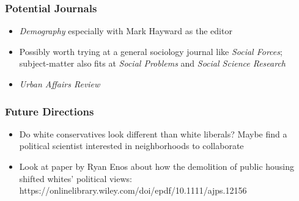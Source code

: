 \documentclass{baderart}
\providecommand{\tightlist}{%
  \setlength{\itemsep}{0pt}\setlength{\parskip}{0pt}}
\begin{document}
\subsubsection{Potential Journals}\label{potential-journals}

\begin{itemize} \tightlist \item   \emph{Demography} especially with Mark Hayward as the editor \item   Possibly worth trying at a general sociology journal like \emph{Social   Forces}; subject-matter also fits at \emph{Social Problems} and   \emph{Social Science Research} \item   \emph{Urban Affairs Review} \end{itemize}

\subsubsection{Future Directions}\label{future-directions}

\begin{itemize} \tightlist \item   Do white conservatives look different than white liberals? Maybe find   a political scientist interested in neighborhoods to collaborate \item   Look at paper by Ryan Enos about how the demolition of public housing   shifted whites' political views:   https://onlinelibrary.wiley.com/doi/epdf/10.1111/ajps.12156 \end{itemize}
\end{document}
